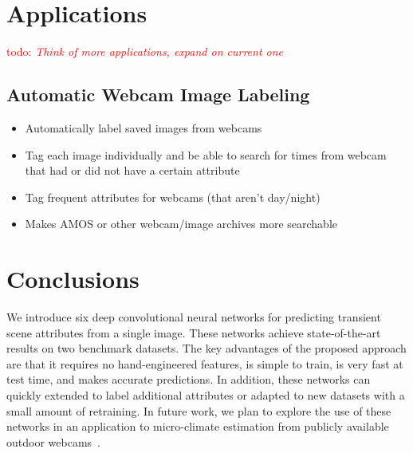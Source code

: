 \documentclass{article}
\newcommand{\todo}[1]{\textcolor{red}{todo: {\em #1}}}
\begin{document}
\section{Applications}
\todo{Think of more applications, expand on current one}
\subsection{Automatic Webcam Image Labeling}

\begin{itemize}

	\item Automatically label saved images from webcams
	\item Tag each image individually and be able to search for times from
			  webcam that had or did not have a certain attribute
	\item Tag frequent attributes for webcams (that aren't day/night)
	\item Makes AMOS or other webcam/image archives more searchable

\end{itemize}


\section{Conclusions}

We introduce six deep convolutional neural networks for predicting
transient scene attributes from a single image. These networks achieve
state-of-the-art results on two benchmark datasets. The key advantages
of the proposed approach are that it requires no hand-engineered
features, is simple to train, is very fast at test time, and makes
accurate predictions. In addition, these networks can quickly extended
to label additional attributes or adapted to new datasets with a small
amount of retraining. In future work, we plan to explore the use of
these networks in an application to micro-climate estimation from
publicly available outdoor webcams~\cite{islam13webcamweather}. 



\end{document}
